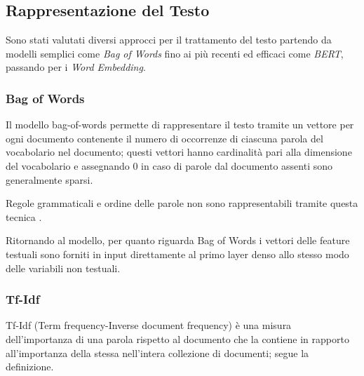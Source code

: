 

\subsection{Rappresentazione del Testo}

Sono stati valutati diversi approcci per il trattamento del testo partendo da
modelli semplici come \textit{Bag of Words} fino ai più recenti ed efficaci come
\textit{BERT}, passando per i \textit{Word Embedding}.

\subsubsection{Bag of Words}
Il modello bag-of-words permette di rappresentare il testo tramite un vettore
per ogni documento contenente il numero di occorrenze di ciascuna parola del
vocabolario nel documento; questi vettori hanno cardinalità pari alla dimensione
del vocabolario e assegnando 0 in caso di parole dal documento assenti sono
generalmente sparsi.

Regole grammaticali e ordine delle parole non sono rappresentabili
tramite questa tecnica \cite{manning_raghavan_schutze_2008}.

Ritornando al modello, per quanto riguarda Bag of Words i vettori delle feature
testuali sono forniti in input direttamente al primo layer denso allo stesso
modo delle variabili non testuali.

\subsubsection{Tf-Idf}\label{section-tfidf} Tf-Idf (Term frequency-Inverse
document frequency) \cite{manning_raghavan_schutze_2008} è una misura
dell'importanza di una parola rispetto al documento che la contiene in rapporto
all'importanza della stessa nell'intera collezione di documenti; segue la
definizione.%


